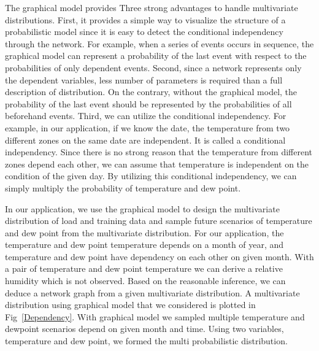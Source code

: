 \documentclass[journal]{IEEEtran} %
\begin{document}
The graphical model provides Three strong advantages to handle multivariate distributions.
First, it provides a simple way to visualize the structure of a probabilistic model since it is easy to detect the conditional independency through the network. For example, when a series of events occurs in sequence, the graphical model can represent a probability of the last event with respect to the probabilities of only dependent events. Second, since a network represents only the dependent variables, less number of parameters is required than a full description of distribution. On the contrary, without the graphical model, the probability of the last event should be represented by the probabilities of all beforehand events.
Third, we can utilize the conditional independency. For example, in our application, if we know the date, the temperature from two different zones on the same date are independent. It is called a conditional independency. Since there is no strong reason that the temperature from different zones depend each other, we can assume that temperature is independent on the condition of the given day. By utilizing this conditional independency, we can simply multiply the probability of temperature and dew point. 


  
  







In our application, we use the graphical model to design the multivariate distribution of load and training data and sample future scenarios of temperature and dew point from the multivariate distribution. For our application, the temperature and dew point temperature depends on a month of year, and temperature and dew point have dependency on each other on given month. With a pair of temperature and dew point temperature we can derive a relative humidity which is not observed. Based on the reasonable inference, we can deduce a network graph from a given multivariate distribution. A multivariate distribution using graphical model that we considered is plotted in Fig~\ref{Dependency}. With graphical model we sampled multiple temperature and dewpoint scenarios depend on given month and time. Using two variables, temperature and dew point, we formed the multi probabilistic distribution.
\end{document}
